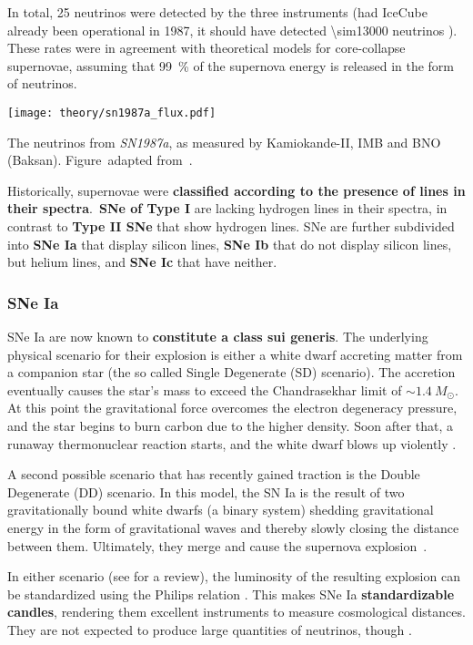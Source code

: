 In total, 25 neutrinos were detected by the three instruments (had IceCube already been operational in 1987, it should have detected \num{\sim13000} neutrinos ). These rates were in agreement with theoretical models for core-collapse supernovae, assuming that \SI{99}{\percent} of the supernova energy is released in the form of neutrinos.

\begin{marginfigure}
    \texttt{[image: theory/sn1987a\_flux.pdf]}
    \caption[Neutrinos from \emph{SN1987a}]{The neutrinos from \emph{SN1987a}, as measured by Kamiokande-II, IMB and BNO (Baksan). Figure\ adapted from~\cite{Grupen2005}.}
\end{marginfigure}

Historically, supernovae were \textbf{classified according to the presence of lines in their spectra}.\ \textbf{SNe of Type I} are lacking hydrogen lines in their spectra, in contrast to \textbf{Type II SNe} that show hydrogen lines. SNe are further subdivided into \textbf{SNe Ia} that display silicon lines, \textbf{SNe Ib} that do not display silicon lines, but helium lines, and \textbf{SNe Ic} that have neither.

\subsubsection{SNe Ia}\label{sne_ia}
SNe Ia are now known to \textbf{constitute a class sui generis}. The underlying physical scenario for their explosion is either a white dwarf accreting matter from a companion star (the so called Single Degenerate (SD) scenario). The accretion eventually causes the star's mass to exceed the Chandrasekhar limit of $\sim1.4~M_\odot$. At this point the gravitational force overcomes the electron degeneracy pressure, and the star begins to burn carbon due to the higher density. Soon after that, a runaway thermonuclear reaction starts, and the white dwarf blows up violently .

A second possible scenario that has recently gained traction is the Double Degenerate (DD) scenario. In this model, the SN Ia is the result of two gravitationally bound white dwarfs (a binary system) shedding gravitational energy in the form of gravitational waves and thereby slowly closing the distance between them. Ultimately, they merge and cause the supernova explosion~\cite{Iben1984}.

In either scenario (see  for a review), the luminosity of the resulting explosion can be standardized using the Philips relation . This makes SNe Ia \textbf{standardizable candles}, rendering them excellent instruments to measure cosmological distances. They are not expected to produce large quantities of neutrinos, though .

